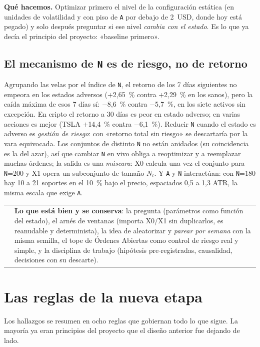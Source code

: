\documentclass[11pt,a4paper]{article}
\makeatletter
\newcommand{\code}[1]{\texttt{\small #1}}
\newcommand{\mn}[1]{$-$#1}
\newenvironment{caja}[1]{%
  \par\medskip\noindent
  \begin{tabular}{@{}p{0.4em}@{\hspace{8pt}}p{\dimexpr\linewidth-2em\relax}@{}}
  \textcolor{#1}{\rule{3pt}{1.1em}} &
}{\end{tabular}\par\medskip}
\newenvironment{advertencia}{\begin{caja}{crojo}}{\end{caja}}
\makeatother
\begin{document}
\textbf{Qué hacemos.} Optimizar primero el nivel de la configuración estática (en unidades de volatilidad y
con piso de \code{A} por debajo de 2~USD, donde hoy está pegado) y solo después preguntar si ese nivel
\emph{cambia con el estado}. Es lo que ya decía el principio del proyecto: «baseline primero».

\subsection{El mecanismo de \code{N} es de riesgo, no de retorno}
Agrupando las velas por el índice de \code{N}, el retorno de los 7 días siguientes no empeora en los estados
adversos (+2,65~\% contra +2,29~\% en los sanos), pero la caída máxima de esos 7 días sí: \mn{}8,6~\% contra
\mn{}5,7~\%, en los siete activos sin excepción. En cripto el retorno a 30 días es peor en estado adverso; en varias
acciones es mejor (TSLA $+$14,4~\% contra \mn{}6,1~\%). Reducir \code{N} cuando el estado es adverso es
\emph{gestión de riesgo}: con «retorno total sin riesgo» se descartaría por la vara equivocada. Los conjuntos
de distinto \code{N} no están anidados (su coincidencia es la del azar), así que cambiar \code{N} en vivo obliga
a reoptimizar y a reemplazar muchas órdenes; la salida es una \emph{máscara}: X0 calcula una vez el conjunto
para \code{N}=200 y X1 opera un subconjunto de tamaño $N_t$. Y \code{A} y \code{N} interactúan: con \code{N}=180
hay 10 a 21 soportes en el 10~\% bajo el precio, espaciados 0,5 a 1,3 ATR, la misma escala que exige \code{A}.

\begin{advertencia}
\textbf{Lo que está bien y se conserva}: la pregunta (parámetros como función del estado), el arnés de ventanas
(importa X0/X1 sin duplicarlos, es reanudable y determinista), la idea de aleatorizar y \emph{parear por semana}
con la misma semilla, el tope de Órdenes Abiertas como control de riesgo real y simple, y la disciplina de
trabajo (hipótesis pre-registradas, causalidad, decisiones con su descarte).
\end{advertencia}

\section{Las reglas de la nueva etapa}\label{sec:reglas}

Los hallazgos se resumen en ocho reglas que gobiernan todo lo que sigue. La mayoría ya eran principios del
proyecto que el diseño anterior fue dejando de lado.
\end{document}
